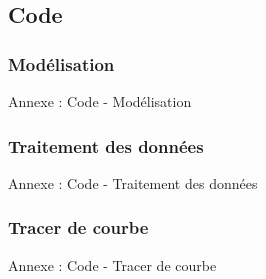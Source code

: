 \documentclass{beamer}
\begin{document}
\subsection{Code}

\subsubsection{Modélisation}

\begin{frame}{Annexe : Code - Modélisation}
    
\end{frame}

\subsubsection{Traitement des données}

\begin{frame}{Annexe : Code - Traitement des données}
    
\end{frame}

\subsubsection{Tracer de courbe}

\begin{frame}[fragile]{Annexe : Code - Tracer de courbe}
    
\end{frame}
\end{document}
